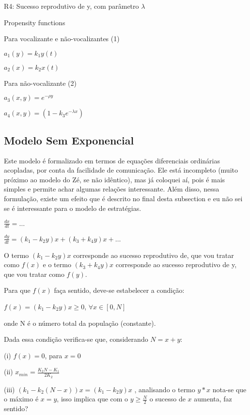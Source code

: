 R4: Sucesso reprodutivo de y, com parâmetro $\lambda$

\vspace{3 mm}
Propensity functions

\vspace{3 mm}
Para vocalizante e não-vocalizantes (1)

\vspace{3 mm}
$a_1(y)=k_1 y(t)$

\vspace{3 mm}
$a_2(x)=k_2 x(t)$

\vspace{3 mm}
Para não-vocalizante (2)

\vspace{3 mm}
$a_3(x,y)=e^{-\rho y}$

\vspace{3 mm}
$a_4(x,y)=(1-k_3 e^{-\lambda x})$


\subsection{Modelo Sem Exponencial}
Este modelo é formalizado em termos de equações diferenciais ordinárias acopladas, por conta da facilidade de comunicação. Ele está incompleto (muito próximo ao modelo do Zé, se não idêntico), mas já coloquei aí, pois é mais simples e permite achar algumas relações interessante. Além disso, nessa formulação, existe um efeito que é descrito no final desta subsection e eu não sei se é interessante para o modelo de estratégias.

\vspace{3 mm}
$\frac{dx}{dt} = \ldots$

\vspace{3 mm}
$\frac{dy}{dt} = (k_1 - k_2 y)x + (k_3 + k_4 y)x + \ldots$

\vspace{3 mm}
O termo $(k_1 - k_2 y)x$ corresponde ao sucesso reprodutivo de, que vou tratar como $f(x)$ e o termo $(k_3 + k_4 y)x$ corresponde ao sucesso reprodutivo de y, que vou tratar como $f(y)$.

Para que $f(x)$ faça sentido, deve-se estabelecer a condição:

\vspace{3 mm}
$f(x)=(k_1 - k_2 y)x \geq 0$, $\forall x \in [0,N]$

onde N é o número total da população (constante).

\vspace{3 mm}
Dada essa condição verifica-se que, considerando $N=x+y$:

\vspace{3 mm}
(i) $f(x) = 0$, para $ x=0 $

\vspace{3 mm}
(ii) $x_{min} = \frac{K_2 N - K_1}{2K_2}$

\vspace{3 mm}
(iii) $(k_1 - k_2 (N-x))x=(k_1 - k_2 y)x$ , analisando o termo $y*x$ nota-se que o máximo é $x=y$, isso implica que com o $y \geq \frac{N}{2}$ o sucesso de $x$ aumenta, faz sentido?